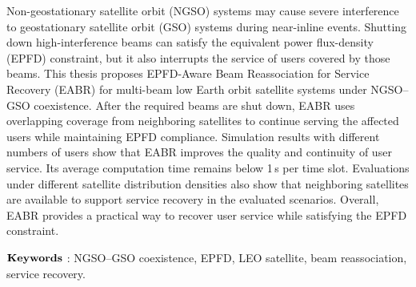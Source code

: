 \begin{abstractEN}

Non-geostationary satellite orbit (NGSO) systems may cause severe interference to geostationary satellite orbit (GSO) systems during near-inline events. Shutting down high-interference beams can satisfy the equivalent power flux-density (EPFD) constraint, but it also interrupts the service of users covered by those beams. This thesis proposes EPFD-Aware Beam Reassociation for Service Recovery (EABR) for multi-beam low Earth orbit satellite systems under NGSO--GSO coexistence. After the required beams are shut down, EABR uses overlapping coverage from neighboring satellites to continue serving the affected users while maintaining EPFD compliance. Simulation results with different numbers of users show that EABR improves the quality and continuity of user service. Its average computation time remains below 1\,s per time slot. Evaluations under different satellite distribution densities also show that neighboring satellites are available to support service recovery in the evaluated scenarios. Overall, EABR provides a practical way to recover user service while satisfying the EPFD constraint.

$\bf{Keywords}$ : NGSO--GSO coexistence, EPFD, LEO satellite, beam reassociation, service recovery.

\end{abstractEN}
